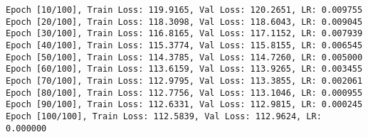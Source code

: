 \documentclass[11pt]{article}
\begin{document}
    \begin{Verbatim}[commandchars=\\\{\}]
Epoch [10/100], Train Loss: 119.9165, Val Loss: 120.2651, LR: 0.009755
Epoch [20/100], Train Loss: 118.3098, Val Loss: 118.6043, LR: 0.009045
Epoch [30/100], Train Loss: 116.8165, Val Loss: 117.1152, LR: 0.007939
Epoch [40/100], Train Loss: 115.3774, Val Loss: 115.8155, LR: 0.006545
Epoch [50/100], Train Loss: 114.3785, Val Loss: 114.7260, LR: 0.005000
Epoch [60/100], Train Loss: 113.6159, Val Loss: 113.9265, LR: 0.003455
Epoch [70/100], Train Loss: 112.9795, Val Loss: 113.3855, LR: 0.002061
Epoch [80/100], Train Loss: 112.7756, Val Loss: 113.1046, LR: 0.000955
Epoch [90/100], Train Loss: 112.6331, Val Loss: 112.9815, LR: 0.000245
Epoch [100/100], Train Loss: 112.5839, Val Loss: 112.9624, LR: 0.000000
    \end{Verbatim}
\end{document}
